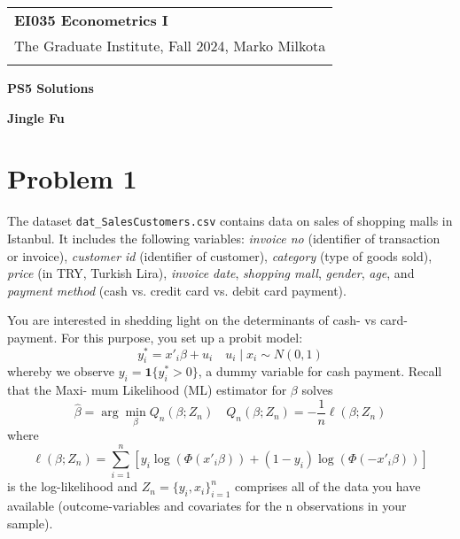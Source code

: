 \documentclass[a4paper,12pt]{article} %
\theoremstyle{nonitalic}
\begin{document}
\thispagestyle{empty} %

\begin{tabular}{p{15.5cm}} %
{\large \bf EI035 Econometrics I} \\
The Graduate Institute, Fall 2024, Marko Milkota\\
\hline %
\\
\end{tabular} %

\vspace*{0.3cm} %

\begin{center} %
	{\Large \bf PS5 Solutions} %
	\vspace{2mm}
	
	{\bf Jingle Fu} %
		
\end{center}  

\vspace{0.4cm}

\section*{Problem 1}

The dataset \texttt{dat\_SalesCustomers.csv} contains data on sales of shopping malls in Istanbul. 
It includes the following variables: \textit{invoice no} (identifier of transaction or invoice), 
\textit{customer id} (identifier of customer), 
\textit{category} (type of goods sold), 
\textit{price} (in TRY, Turkish Lira), 
\textit{invoice date}, \textit{shopping mall}, \textit{gender}, 
\textit{age}, and \textit{payment method} (cash vs. credit card vs. debit card payment). 

You are interested in shedding light on the determinants of cash- vs card-payment. 
For this purpose, you set up a probit model:
\begin{equation}
    y^*_i = x'_i \beta + u_i \quad  u_i \mid x_i \sim N(0, 1)
\end{equation}
whereby we observe $y_i = \mathbf{1}\{y^*_i > 0\}$, a dummy variable for cash payment. Recall that the Maxi-
mum Likelihood (ML) estimator for $\beta $ solves
\begin{equation}
    \hat{\beta} = \arg\min_{\beta} Q_n(\beta; Z_n) \quad Q_n(\beta; Z_n) = -\frac{1}{n} \ell(\beta; Z_n)
\end{equation}
where
\[\ell(\beta; Z_n) = \sum_{i=1}^n \left[ y_i \log(\Phi(x'_i \beta)) + (1 - y_i) \log(\Phi(-x'_i \beta)) \right] \]
is the log-likelihood and $Z_n = \{y_i, x_i\}^n_{i=1}$ comprises all of the data you have available (outcome-variables and covariates for the n observations in your sample).
\end{document}
